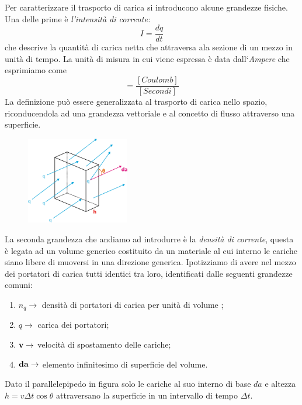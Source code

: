 Per caratterizzare il trasporto di carica si introducono alcune grandezze fisiche. Una delle prime \`e \textit{l'intensit\`a di corrente:}
\begin{equation*}
	I = \frac{dq}{dt}
\end{equation*} 
che descrive la quantit\`a di carica netta che attraversa ala sezione di un mezzo in unit\`a di tempo. La unit\`a di misura in cui viene espressa \`e data dall`\textit{Ampere} che esprimiamo come
\begin{equation*}
	[A] = \frac{[ Coulomb]}{[ Secondi]}
\end{equation*}
La definizione pu\`o essere generalizzata al trasporto di carica nello spazio, riconducendola ad una grandezza vettoriale e al concetto di flusso attraverso una superficie.
\begin{figure}  %
    \centering
    \includegraphics[width=0.4\textwidth]{images/fluxden}  %
\end{figure}

La seconda grandezza che andiamo ad introdurre \`e la \textit{densit\`a di corrente}, questa \`e legata ad un volume generico costituito da un materiale al cui interno le cariche siano libere di muoversi in una direzione generica. Ipotizziamo di avere nel mezzo dei portatori di carica tutti identici tra loro, identificati dalle seguenti grandezze comuni:

\begin{enumerate}
	\item $n_q \rightarrow$ densit\`a di portatori di carica per unit\`a di volume ;
	\item $q \rightarrow $ carica dei portatori;
	\item $\bold{v} \rightarrow $ velocit\`a di spostamento delle cariche;
	\item $\bold{da} \rightarrow$  elemento infinitesimo di superficie del volume.  
\end{enumerate} 
Dato il parallelepipedo in figura solo le cariche al suo interno di base $da$ e altezza $h = v \Delta t \cos \theta $ attraversano la superficie in un intervallo di tempo $\Delta t$.

